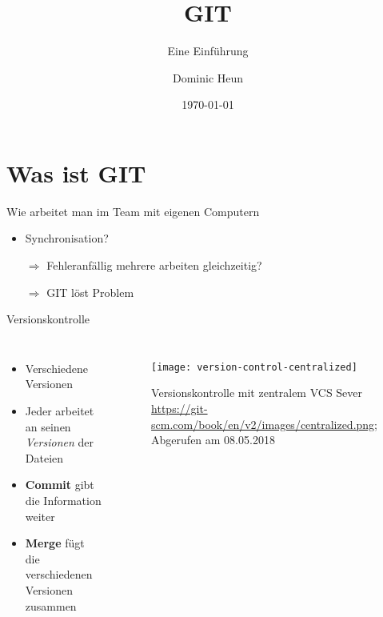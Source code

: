 \documentclass[aspectratio=169]{beamer}
\title{GIT}
\subtitle{Eine Einführung}
\author[Dominic]{Dominic Heun}
\institute{AES Ettlingen - TGJ2/2}
\date{\today}
\begin{document}


  \begin{frame}[plain]
    \titlepage
  \end{frame}

  \section{Was ist GIT}

  \begin{frame}{Wie arbeitet man im Team mit eigenen Computern}
    \begin{itemize}[<+->]
      \item Synchronisation?
      \item[$\Rightarrow$] Fehleranfällig \pause mehrere arbeiten gleichzeitig?
      \item[$\Rightarrow$] GIT löst Problem
    \end{itemize}
  \end{frame}

  \begin{frame}{Versionskontrolle}
      \begin{columns}

          \begin{itemize}
            \item Verschiedene Versionen
            \item Jeder arbeitet an seinen \textit{Versionen} der Dateien
            \item \textbf{Commit} gibt die Information weiter
            \item \textbf{Merge} fügt die verschiedenen Versionen zusammen
          \end{itemize}

          \begin{figure}
            \texttt{[image: version-control-centralized]}
            \caption{Versionskontrolle mit zentralem VCS Sever \\
            \tiny{\url{https://git-scm.com/book/en/v2/images/centralized.png}; Abgerufen am 08.05.2018}}
          \end{figure}
      \end{columns}
  \end{frame}
\end{document}
